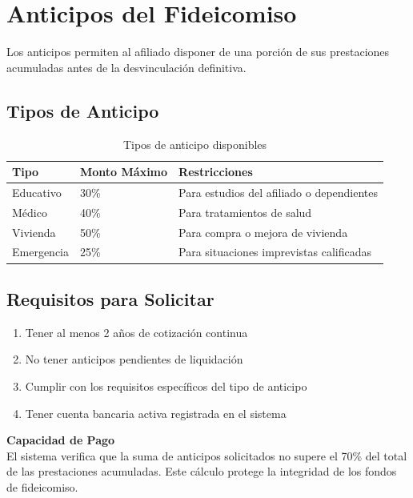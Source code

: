 \section{Anticipos del Fideicomiso}

Los anticipos permiten al afiliado disponer de una porción de sus prestaciones acumuladas antes de la desvinculación definitiva.

\subsection*{Tipos de Anticipo}

\begin{longtable}{p{3cm}p{4cm}p{5cm}}
\toprule
\textbf{Tipo} & \textbf{Monto Máximo} & \textbf{Restricciones} \\
\midrule
\endhead
\bottomrule
\caption{Tipos de anticipo disponibles}
\label{tab:tipos-anticipo}
\endlastfoot

Educativo & 30\% & Para estudios del afiliado o dependientes \\
Médico & 40\% & Para tratamientos de salud \\
Vivienda & 50\% & Para compra o mejora de vivienda \\
Emergencia & 25\% & Para situaciones imprevistas calificadas \\
\end{longtable}

\subsection*{Requisitos para Solicitar}

\begin{enumerate}[leftmargin=*]
    \item Tener al menos 2 años de cotización continua
    \item No tener anticipos pendientes de liquidación
    \item Cumplir con los requisitos específicos del tipo de anticipo
    \item Tener cuenta bancaria activa registrada en el sistema
\end{enumerate}

\begin{tcolorbox}[
    enhanced,
    colback=sandraSoft,
    colframe=sandraDark,
    width=0.9\textwidth,
    halign=center
]
\small
\textbf{Capacidad de Pago}\\
\smallskip
El sistema verifica que la suma de anticipos solicitados no supere el 70\% del total de las prestaciones acumuladas. Este cálculo protege la integridad de los fondos de fideicomiso.
\end{tcolorbox}

